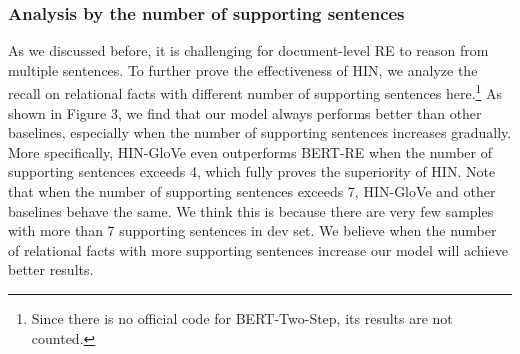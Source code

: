 \documentclass[runningheads]{llncs}
\begin{document}
\subsubsection{Analysis by the number of supporting sentences}
As we discussed before, it is challenging for document-level RE to reason from multiple sentences.
To further prove the effectiveness of HIN, we analyze the recall on relational facts with different number of supporting sentences here.\footnote{Since there is no official code for BERT-Two-Step, its results are not counted.}
As shown in Figure 3, we find that our model always performs better than other baselines, especially when the number of supporting sentences increases gradually.
More specifically, HIN-GloVe even outperforms BERT-RE when the number of supporting sentences exceeds 4, 
which fully proves the superiority of HIN.
Note that when the number of supporting sentences exceeds 7, HIN-GloVe and other baselines behave the same.
We think this is because there are very few samples with more than 7 supporting sentences in dev set.
We believe when the number of relational facts with more supporting sentences increase our model will achieve better results.
\end{document}
